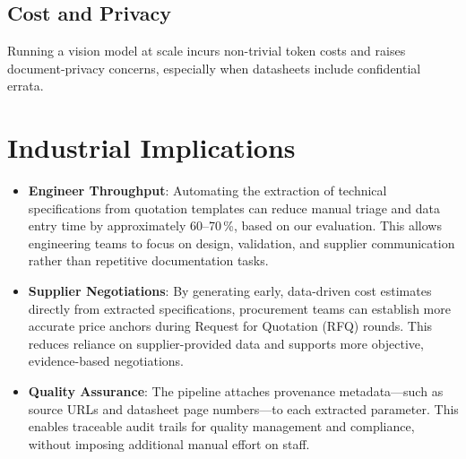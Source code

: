 \subsection{Cost and Privacy}
Running a vision model at scale incurs non-trivial token costs and raises document-privacy concerns, especially when datasheets include confidential errata.

\section{Industrial Implications}
\begin{itemize}
  \item \textbf{Engineer Throughput}: Automating the extraction of technical specifications from quotation templates can reduce manual triage and data entry time by approximately 60–70\,\%, based on our evaluation. This allows engineering teams to focus on design, validation, and supplier communication rather than repetitive documentation tasks.
  \item \textbf{Supplier Negotiations}: By generating early, data-driven cost estimates directly from extracted specifications, procurement teams can establish more accurate price anchors during Request for Quotation (RFQ) rounds. This reduces reliance on supplier-provided data and supports more objective, evidence-based negotiations.
  \item \textbf{Quality Assurance}: The pipeline attaches provenance metadata—such as source URLs and datasheet page numbers—to each extracted parameter. This enables traceable audit trails for quality management and compliance, without imposing additional manual effort on staff.
\end{itemize}


